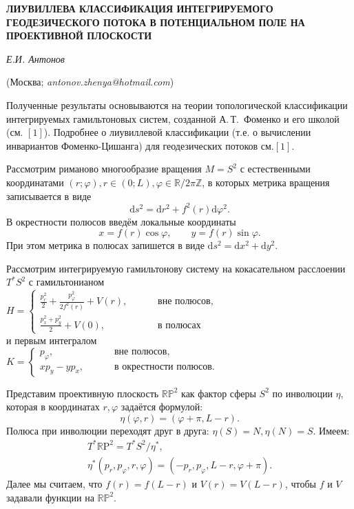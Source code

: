 \begin{center}
    {\bf ЛИУВИЛЛЕВА КЛАССИФИКАЦИЯ ИНТЕГРИРУЕМОГО ГЕОДЕЗИЧЕСКОГО ПОТОКА В ПОТЕНЦИАЛЬНОМ ПОЛЕ НА ПРОЕКТИВНОЙ ПЛОСКОСТИ}

    {\it Е.И. Антонов}

    (Москва; {\it antonov.zhenya@hotmail.com})
\end{center}





Полученные результаты основываются на теории топологической классификации интегрируемых гамильтоновых систем, созданной А.\,Т.~Фоменко и его школой (см. $\left[1\right]$). Подробнее о лиувиллевой классификации (т.е. о вычислении инвариантов Фоменко-Цишанга) для геодезических потоков см.$\left[1\right]$.



Рассмотрим риманово многообразие вращения $M=S^2$ с естественными координатами $(r;\varphi), r \in (0;L), \varphi \in \mathbb{R}/2\pi\mathbb{Z}$, в которых метрика вращения записывается в виде
\[\mathrm{d}s^2=\mathrm{d}r^2+f^2(r)\mathrm{d}\varphi^2.\] В окрестности полюсов введём локальные координаты
\[x=f(r)\cos{\varphi},\qquad y=f(r)\sin{\varphi}.\] При этом метрика в полюсах запишется в виде $\mathrm{d}s^2=\mathrm{d}x^2+\mathrm{d}y^2$.


Рассмотрим интегрируемую гамильтонову систему на кокасательном расслоении $T^*S^2$ с гамильтонианом
\\
$ H = \begin{cases} \displaystyle \frac{p^2_{r}}{2}+\frac{p^2_{\varphi}}{2f^2(r)}+V(r), \qquad & \text{ вне полюсов,} \\ \displaystyle \frac{p^2_{x}+p^2_{y}}{2}+V(0), \qquad & \text{ в полюсах} \end{cases} $
\\
и первым интегралом
\\
 $K= \begin{cases} p_{\varphi}, \qquad &\text{ вне полюсов,} \\ xp_{y}-yp_{x}, \qquad & \text{ в окрестности полюсов.} \end{cases} $



Представим проективную плоскость $\mathbb{RP}^2$ как фактор сферы $S^2$ по инволюции $\eta$, которая в координатах $r,\varphi$ задаётся формулой: \[ \eta (\varphi, r) = (\varphi + \pi, L-r).\] Полюса при инволюции переходят друг в друга: $\eta (S)=N,\eta(N)=S$. Имеем: \begin{gather*}
 T^{*}\mathbb{R}\mathrm{P}^2=T^{*}S^2/\eta ^{*},\\
 \eta^{*}(p_{r},p_{\varphi},r,\varphi)=(-p_{r},p_{\varphi},L-r,\varphi+\pi).
 \end{gather*} Далее мы считаем, что $f(r)=f(L-r)$ и $V(r) = V(L-r)$, чтобы $f$ и $V$ задавали функции на $\mathbb{RP}^2$.


